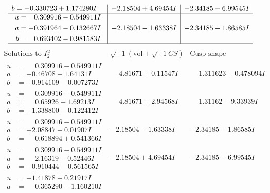 \documentclass[1p]{elsarticle_modified}
\theoremstyle{definition}
\newcommand{\I}{\sqrt{-1}}
\begin{document}
$$\begin{array}{c|c|c}
\begin{aligned}
b &= -0.330723 + 1.174280 I\end{aligned}
 & -2.18504 + 4.69454 I & -2.34185 - 6.99545 I \\ \hline\begin{aligned}
u &= \phantom{-}0.309916 - 0.549911 I \\
a &= -0.391964 - 0.132667 I \\
b &= \phantom{-}0.693402 - 0.981583 I\end{aligned}
 & -2.18504 - 1.63338 I & -2.34185 - 1.86585 I\\
 \hline 
 \end{array}$$\newpage$$\begin{array}{c|c|c}  
\text{Solutions to }I^u_{2}& \I (\text{vol} + \sqrt{-1}CS) & \text{Cusp shape}\\
 \hline 
\begin{aligned}
u &= \phantom{-}0.309916 - 0.549911 I \\
a &= -0.46708 - 1.64131 I \\
b &= -0.914109 - 0.007273 I\end{aligned}
 & \phantom{-}4.81671 + 0.11547 I & \phantom{-}1.311623 + 0.478094 I \\ \hline\begin{aligned}
u &= \phantom{-}0.309916 - 0.549911 I \\
a &= \phantom{-}0.65926 - 1.69213 I \\
b &= -1.338800 - 0.122412 I\end{aligned}
 & \phantom{-}4.81671 + 2.94568 I & \phantom{-}1.31162 - 9.33939 I \\ \hline\begin{aligned}
u &= \phantom{-}0.309916 - 0.549911 I \\
a &= -2.08847 - 0.01907 I \\
b &= \phantom{-}0.618894 + 0.541366 I\end{aligned}
 & -2.18504 - 1.63338 I & -2.34185 - 1.86585 I \\ \hline\begin{aligned}
u &= \phantom{-}0.309916 - 0.549911 I \\
a &= \phantom{-}2.16319 - 0.52446 I \\
b &= -0.910444 - 0.561565 I\end{aligned}
 & -2.18504 + 4.69454 I & -2.34185 - 6.99545 I \\ \hline\begin{aligned}
u &= -1.41878 + 0.21917 I \\
a &= \phantom{-}0.365290 - 1.160210 I \\

\end{aligned}
\end{array}$$
\end{document}
